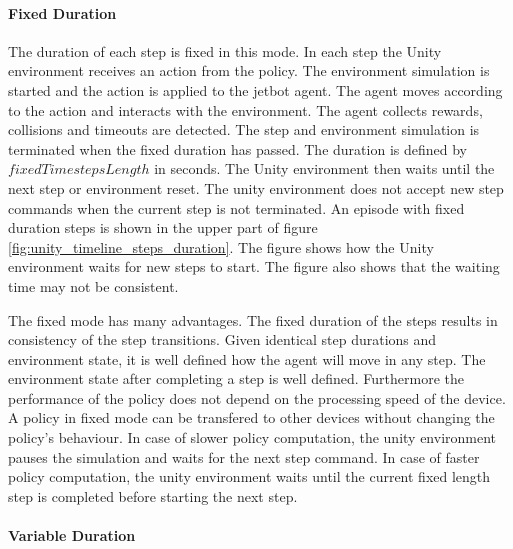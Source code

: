 \paragraph{Fixed Duration}

The duration of each step is fixed in this mode. In each step the Unity environment receives an action from the policy. The environment simulation is started and the action is applied to the jetbot agent. The agent moves according to the action and interacts with the environment. The agent collects rewards, collisions and timeouts are detected. The step and environment simulation is terminated when the fixed duration has passed. The duration is defined by $fixedTimestepsLength$ in seconds. The Unity environment then waits until the next step or environment reset. The unity environment does not accept new step commands when the current step is not terminated.
An episode with fixed duration steps is shown in the upper part of figure \ref{fig:unity_timeline_steps_duration}. The figure shows how the Unity environment waits for new steps to start. The figure also shows that the waiting time may not be consistent.

The fixed mode has many advantages. The fixed duration of the steps results in consistency of the step transitions. Given identical step durations and environment state, it is well defined how the agent will move in any step. The environment state after completing a step is well defined.
Furthermore the performance of the policy does not depend on the processing speed of the device. A policy in fixed mode can be transfered to other devices without changing the policy's behaviour. In case of slower policy computation, the unity environment pauses the simulation and waits for the next step command. In case of faster policy computation, the unity environment waits until the current fixed length step is completed before starting the next step.





\paragraph{Variable Duration}

